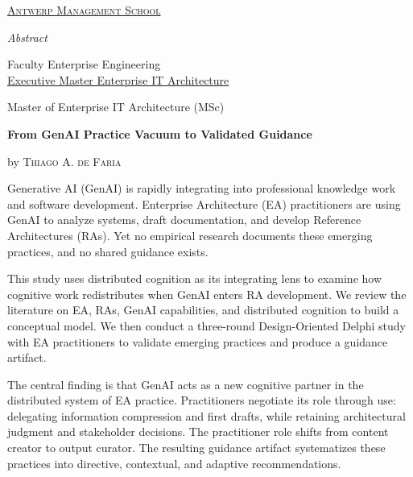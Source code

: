 \begin{center}
\vspace*{1.5cm}

{\large\href{https://www.antwerpmanagementschool.be/}{\textsc{Antwerp Management School}}}

\vspace{0.8cm}
{\LARGE\textit{Abstract}}

\vspace{0.6cm}
Faculty Enterprise Engineering\\
\href{https://www.antwerpmanagementschool.be/en/program/executive-master-digital-leadership-and-transformation/major-enterprise-it-architecture}{Executive Master Enterprise IT Architecture}

\vspace{0.4cm}
Master of Enterprise IT Architecture (MSc)

\vspace{0.6cm}
{\large\bfseries From GenAI Practice Vacuum to Validated Guidance}

\vspace{0.3cm}
by \textsc{Thiago A. de Faria}

\end{center}

\vspace{0.8cm}

Generative AI (GenAI) is rapidly integrating into professional knowledge work
and software development. Enterprise Architecture (EA) practitioners are using
GenAI to analyze systems, draft documentation, and develop Reference
Architectures (RAs). Yet no empirical research documents these emerging
practices, and no shared guidance exists.

This study uses distributed cognition as its integrating lens to examine how
cognitive work redistributes when GenAI enters RA development. We review the
literature on EA, RAs, GenAI capabilities, and distributed cognition to build a
conceptual model. We then conduct a three-round Design-Oriented Delphi study
with EA practitioners to validate emerging practices and produce a guidance
artifact.

The central finding is that GenAI acts as a new cognitive partner in the
distributed system of EA practice. Practitioners negotiate its role through
use: delegating information compression and first drafts, while retaining
architectural judgment and stakeholder decisions. The practitioner role shifts
from content creator to output curator. The resulting guidance artifact
systematizes these practices into directive, contextual, and adaptive
recommendations.

